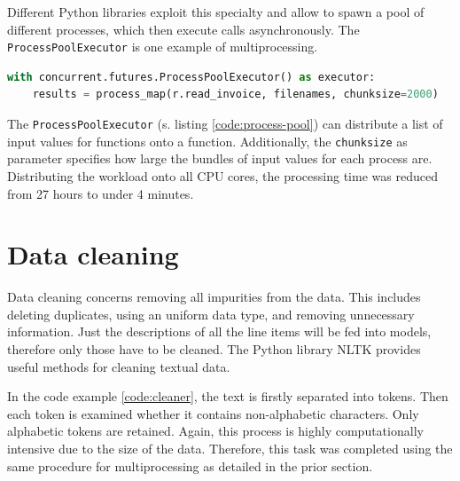 	Different Python libraries exploit this specialty and allow to spawn a pool of different processes, which then execute calls asynchronously. The \lstinline|ProcessPoolExecutor| is one example of multiprocessing.
	
\begin{lstlisting}[language=python, 
label=code:process-pool,
caption=Spawning a Process Pool in Python,
style=EigenerPythonStyle]   
with concurrent.futures.ProcessPoolExecutor() as executor:
	results = process_map(r.read_invoice, filenames, chunksize=2000)
\end{lstlisting}

	The \lstinline|ProcessPoolExecutor| (s. listing \ref{code:process-pool}) can distribute a list of input values for functions onto a function. Additionally, the \lstinline|chunksize| as parameter specifies how large the bundles of input values for each process are. Distributing the workload onto all \ac{CPU} cores, the processing time was reduced from 27 hours to under 4 minutes. 
	
	\section{Data cleaning}
	Data cleaning concerns removing all impurities from the data. This includes deleting duplicates, using an uniform data type, and removing unnecessary information.
	Just the descriptions of all the line items will be fed into models, therefore only those have to be cleaned. The Python library \ac{NLTK} provides useful methods for cleaning textual data.
	
	
	
	In the code example \ref{code:cleaner}, the text is firstly separated into tokens. Then each token is examined whether it contains non-alphabetic characters. Only alphabetic tokens are retained. Again, this process is highly computationally intensive due to the size of the data. Therefore, this task was completed using the same procedure for multiprocessing as detailed in the prior section.
	
